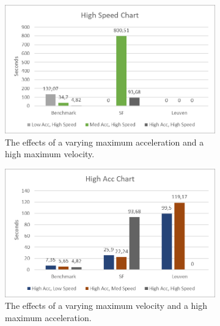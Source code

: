 \begin{figure}
	\centering
	
	\begin{subfigure}[t]{.9\textwidth}
        		\includegraphics[width=\textwidth]{img/agility-high-speed}
        		\caption{The effects of a varying maximum acceleration and a high maximum velocity.}
        		\label{fig:agility-high-speed}
	\end{subfigure}
		
	\begin{subfigure}[t]{.9\textwidth}
        		\includegraphics[width=\textwidth]{img/agility-high-acc}
        		\caption{The effects of a varying maximum velocity and a high maximum acceleration.}
        		\label{fig:agility-high-acc}
	\end{subfigure}	
	
        
    \caption{}\label{fig:agility-high}
\end{figure}



\clearpage
